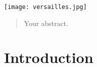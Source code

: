 \documentclass[12pt]{article}
\begin{document}
\begin{titlepage}



\texttt{[image: versailles.jpg]} %
 

\vfill %

\end{titlepage}


\begin{abstract}
Your abstract.
\end{abstract}

\section{Introduction}
\end{document}
